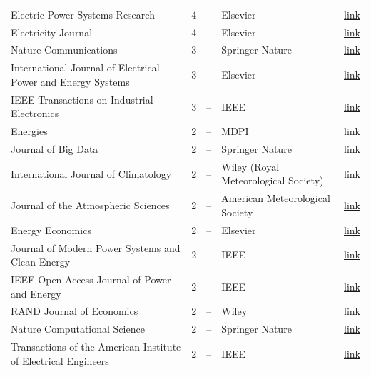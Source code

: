 \begin{table}[htbp]
\begin{tabular}{lrcll}
    Electric Power Systems Research & 4 & -- & Elsevier & \href{https://www.sciencedirect.com/journal/electric-power-systems-research}{link} \\
    Electricity Journal & 4 & -- & Elsevier & \href{https://www.sciencedirect.com/journal/the-electricity-journal}{link} \\
    Nature Communications & 3 & -- & Springer Nature & \href{https://www.nature.com/ncomms/}{link} \\
    International Journal of Electrical Power and Energy Systems & 3 & -- & Elsevier & \href{https://www.sciencedirect.com/journal/international-journal-of-electrical-power-and-energy-systems}{link} \\
    IEEE Transactions on Industrial Electronics & 3 & -- & IEEE & \href{https://ieeexplore.ieee.org/xpl/RecentIssue.jsp?punumber=41}{link} \\
    Energies & 2 & -- & MDPI & \href{https://www.mdpi.com/journal/energies}{link} \\
    Journal of Big Data & 2 & -- & Springer Nature & \href{https://journalofbigdata.springeropen.com/}{link} \\
    International Journal of Climatology & 2 & -- & Wiley (Royal Meteorological Society) & \href{https://rmets.onlinelibrary.wiley.com/journal/10970088}{link} \\
    Journal of the Atmospheric Sciences & 2 & -- & American Meteorological Society & \href{https://journals.ametsoc.org/view/journals/atsc/atsc-overview.xml}{link} \\
    Energy Economics & 2 & -- & Elsevier & \href{https://www.sciencedirect.com/journal/energy-economics}{link} \\
    Journal of Modern Power Systems and Clean Energy & 2 & -- & IEEE & \href{https://www.mpce.info/}{link} \\
    IEEE Open Access Journal of Power and Energy & 2 & -- & IEEE & \href{https://ieeexplore.ieee.org/xpl/RecentIssue.jsp?punumber=8784343}{link} \\
    RAND Journal of Economics & 2 & -- & Wiley & \href{https://onlinelibrary.wiley.com/journal/17562171}{link} \\
    Nature Computational Science & 2 & -- & Springer Nature & \href{https://www.nature.com/natcomputsci/}{link} \\
    Transactions of the American Institute of Electrical Engineers & 2 & -- & IEEE & \href{https://ieeexplore.ieee.org/xpl/RecentIssue.jsp?punumber=4763772}{link} \\

\end{tabular}
\end{table}
